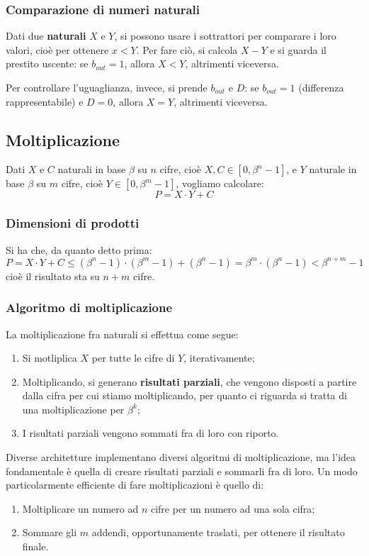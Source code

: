 \documentclass[a4paper,11pt]{article}
\begin{document}
\subsubsection{Comparazione di numeri naturali}
Dati due \textbf{naturali} $X$ e $Y$, si possono usare i sottrattori per comparare i loro valori, cioè per ottenere $x < Y$.
Per fare ciò, si calcola $X - Y$ e si guarda il prestito uscente: se $b_{out} = 1$, allora $X<Y$, altrimenti viceversa.

Per controllare l'uguaglianza, invece, si prende $b_{out}$ e $D$: se $b_{out} = 1$ (differenza rappresentabile) e $D=0$, allora $X = Y$, altrimenti viceversa.

\subsection{Moltiplicazione}
Dati $X$ e $C$ naturali in base $\beta$ su $n$ cifre, cioè $X,C \in [0, \beta^n - 1]$, e $Y$ naturale in base $\beta$ su $m$ cifre, cioè $Y \in [0, \beta^m - 1]$, vogliamo calcolare:
$$
P = X \cdot Y + C 
$$

\subsubsection{Dimensioni di prodotti}
Si ha che, da quanto detto prima:
$$
P = X \cdot Y + C \leq (\beta^n - 1) \cdot (\beta^m - 1) + (\beta^n - 1) = \beta^m \cdot (\beta^n - 1) < \beta^{n+m} - 1 
$$
cioè il risultato sta su $n+m$ cifre.

\subsubsection{Algoritmo di moltiplicazione}
La moltiplicazione fra naturali si effettua come segue:

\begin{enumerate}
	\item Si motliplica $X$ per tutte le cifre di $Y$, iterativamente;
	\item Moltiplicando, si generano \textbf{risultati parziali}, che vengono disposti a partire dalla cifra per cui stiamo moltiplicando, per quanto ci riguarda si tratta di una moltiplicazione per $\beta^k$;
	\item I risultati parziali vengono sommati fra di loro con riporto.
\end{enumerate}

Diverse architetture implementano diversi algoritmi di moltiplicazione, ma l'idea fondamentale è quella di creare risultati parziali e sommarli fra di loro.
Un modo particolarmente efficiente di fare moltiplicazioni è quello di:
\begin{enumerate}
	\item Moltiplicare un numero ad $n$ cifre per un numero ad una sola cifra;
	\item Sommare gli $m$ addendi, opportunamente traslati, per ottenere il risultato finale.
\end{enumerate}
\end{document}
